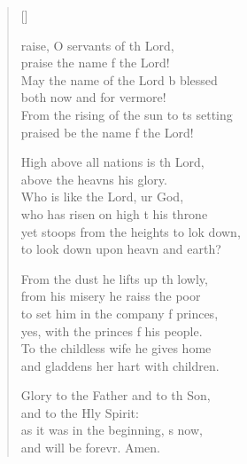 \settowidth{\versewidth}{From the rising of the sun to its setting *}
\begin{verse}[\versewidth]
  \begin{patverse}
raise, O servants of th Lord,\Med\\
praise the name f the Lord!\\
May the name of the Lord b blessed\Med\\
both now and for vermore!\\
From the rising of the sun to \pointup{\i}ts setting\Med\\
praised be the name f the Lord!

High above all nations is th Lord,\Med\\
above the heavns his glory.\\
Who is like the Lord, ur God,\Med\\
who has risen on high t his throne\\
yet stoops from the heights to lok down,\Med\\
to look down upon heavn and earth?

From the dust he lifts up th lowly,\Med\\
from his misery he raiss the poor\\
to set him in the company f princes,\Med\\
yes, with the princes f his people.\\
To the childless wife he gives  home\Med\\
and gladdens her hart with children.

Glory to the Father and to th Son,\Med\\
and to the Hly Spirit:\\
as it was in the beginning, \pointup{\i}s now,\Med\\
and will be forevr. Amen.
  \end{patverse}
\end{verse}
